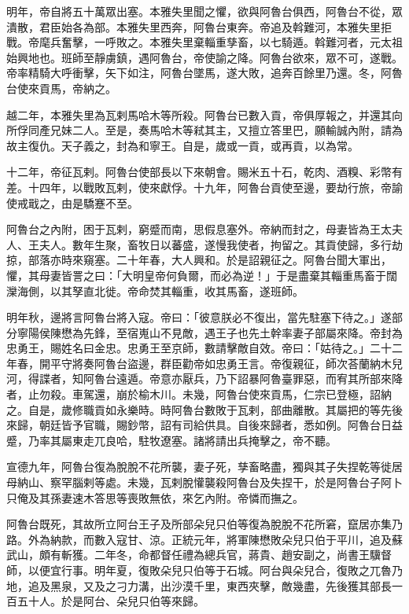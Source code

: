 \begin{pinyinscope}
明年，帝自將五十萬眾出塞。本雅失里聞之懼，欲與阿魯台俱西，阿魯台不從，眾潰散，君臣始各為部。本雅失里西奔，阿魯台東奔。帝追及斡難河，本雅失里拒戰。帝麾兵奮擊，一呼敗之。本雅失里棄輜重孳畜，以七騎遁。斡難河者，元太祖始興地也。班師至靜虜鎮，遇阿魯台，帝使諭之降。阿魯台欲來，眾不可，遂戰。帝率精騎大呼衝擊，矢下如注，阿魯台墜馬，遂大敗，追奔百餘里乃還。冬，阿魯台使來貢馬，帝納之。

越二年，本雅失里為瓦剌馬哈木等所殺。阿魯台已數入貢，帝俱厚報之，并還其向所俘同產兄妹二人。至是，奏馬哈木等弒其主，又擅立答里巴，願輸誠內附，請為故主復仇。天子義之，封為和寧王。自是，歲或一貢，或再貢，以為常。

十二年，帝征瓦剌。阿魯台使部長以下來朝會。賜米五十石，乾肉、酒糗、彩幣有差。十四年，以戰敗瓦剌，使來獻俘。十九年，阿魯台貢使至邊，要劫行旅，帝諭使戒戢之，由是驕蹇不至。

阿魯台之內附，困于瓦剌，窮蹙而南，思假息塞外。帝納而封之，母妻皆為王太夫人、王夫人。數年生聚，畜牧日以蕃盛，遂慢我使者，拘留之。其貢使歸，多行劫掠，部落亦時來窺塞。二十年春，大人興和。於是詔親征之。阿魯台聞大軍出，懼，其母妻皆詈之曰：「大明皇帝何負爾，而必為逆！」于是盡棄其輜重馬畜于闊灤海側，以其孥直北徙。帝命焚其輜重，收其馬畜，遂班師。

明年秋，邊將言阿魯台將入寇。帝曰：「彼意朕必不復出，當先駐塞下待之。」遂部分寧陽侯陳懋為先鋒，至宿嵬山不見敵，遇王子也先土幹率妻子部屬來降。帝封為忠勇王，賜姓名曰金忠。忠勇王至京師，數請擊敵自效。帝曰：「姑待之。」二十二年春，開平守將奏阿魯台盜邊，群臣勸帝如忠勇王言。帝復親征，師次荅蘭納木兒河，得諜者，知阿魯台遠遁。帝意亦厭兵，乃下詔暴阿魯臺罪惡，而宥其所部來降者，止勿殺。車駕還，崩於榆木川。未幾，阿魯台使來貢馬，仁宗已登極，詔納之。自是，歲修職貢如永樂時。時阿魯台數敗于瓦剌，部曲離散。其屬把的等先後來歸，朝廷皆予官職，賜鈔幣，詔有司給供具。自後來歸者，悉如例。阿魯台日益蹙，乃率其屬東走兀良哈，駐牧遼塞。諸將請出兵掩擊之，帝不聽。

宣德九年，阿魯台復為脫脫不花所襲，妻子死，孳畜略盡，獨與其子失捏乾等徙居母納山、察罕腦剌等處。未幾，瓦剌脫懽襲殺阿魯台及失捏干，於是阿魯台子阿卜只俺及其孫妻速木答思等喪敗無依，來乞內附。帝憐而撫之。

阿魯台既死，其故所立阿台王子及所部朵兒只伯等復為脫脫不花所窘，竄居亦集乃路。外為納款，而數入寇甘、涼。正統元年，將軍陳懋敗朵兒只伯于平川，追及蘇武山，頗有斬獲。二年冬，命都督任禮為總兵官，蔣貴、趙安副之，尚書王驥督師，以便宜行事。明年夏，復敗朵兒只伯等于石城。阿台與朵兒合，復敗之兀魯乃地，追及黑泉，又及之刁力溝，出沙漠千里，東西夾擊，敵幾盡，先後獲其部長一百五十人。於是阿台、朵兒只伯等來歸。


\end{pinyinscope}
